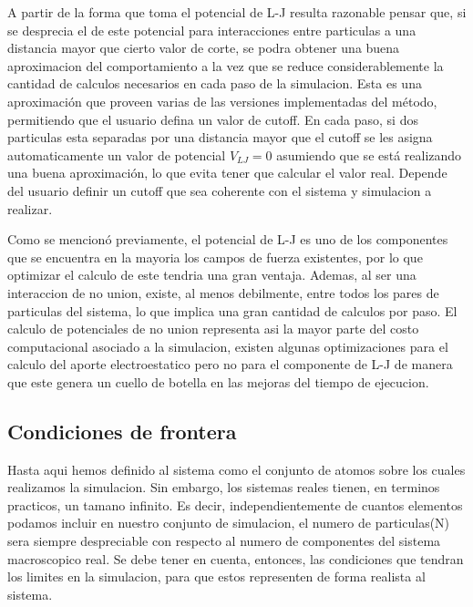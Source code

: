 \documentclass[a4paper,10pt]{report}
\begin{document}
A partir de la forma que toma el potencial de L-J resulta razonable pensar que, si se desprecia el de este potencial para interacciones entre particulas a una distancia mayor que cierto valor de corte, se podra obtener una buena aproximacion del comportamiento a la vez que se reduce considerablemente la cantidad de calculos necesarios en cada paso de la simulacion.
Esta es una aproximación que proveen varias de las versiones implementadas del método, permitiendo que el usuario defina un valor de cutoff. 
En cada paso, si dos particulas esta separadas por una distancia mayor que el cutoff se les asigna automaticamente un valor de potencial $V_{LJ}=0$ asumiendo que se está realizando una buena aproximación, lo que evita tener que calcular el valor real. 
Depende del usuario definir un cutoff que sea coherente con el sistema y simulacion a realizar.









Como se mencionó previamente, el potencial de L-J es uno de los componentes que se encuentra en la mayoria los campos de fuerza existentes, por lo que optimizar el calculo de este tendria una gran ventaja. 
Ademas, al ser una interaccion de no union, existe, al menos debilmente, entre todos los pares de particulas del sistema, lo que implica una gran cantidad de calculos por paso. El calculo de potenciales de no union representa asi la mayor parte del costo computacional asociado a la simulacion, existen algunas optimizaciones para el calculo del aporte electroestatico pero no para el componente de L-J de manera que este genera un cuello de botella en las mejoras del tiempo de ejecucion.





\subsection{Condiciones de frontera}

Hasta aqui hemos definido al sistema como el conjunto de atomos sobre los cuales realizamos la simulacion. Sin embargo, los sistemas reales tienen, en terminos practicos, un tamano infinito. 
Es decir, independientemente de cuantos elementos podamos incluir en nuestro conjunto de simulacion, el numero de particulas(N) sera siempre despreciable con respecto al numero de componentes del sistema macroscopico real.
Se debe tener en cuenta, entonces, las condiciones que tendran los limites en la simulacion, para que estos representen de forma realista al sistema.
\end{document}

